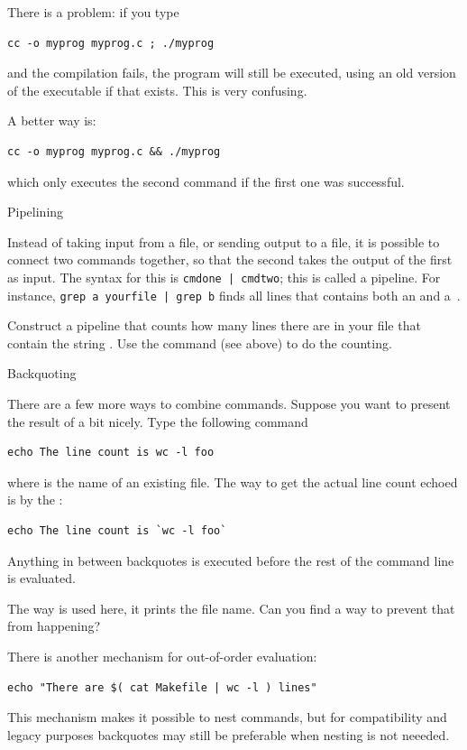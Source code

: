 There is a problem: if you type
\begin{lstlisting}
cc -o myprog myprog.c ; ./myprog
\end{lstlisting}
and the compilation fails, the program will still be executed,
using an old version of the executable if that exists. This is very
confusing.

A better way is:
\begin{lstlisting}
cc -o myprog myprog.c && ./myprog
\end{lstlisting}
which only executes the second command if the first one was
successful.

 {Pipelining}

Instead of taking input from a file, or sending output to a file, it
is possible to connect two commands together, so that the second takes
the output of the first as input. The syntax for this is
\verb+cmdone | cmdtwo+; this is called a pipeline. For instance,
\verb+grep a yourfile | grep b+ finds all lines that contains both an
 and a~.

\begin{exercise}
  Construct a pipeline that counts how many lines there are in your
  file that contain the string . Use the  command (see
  above) to do the counting.
\end{exercise}

 {Backquoting}
\label{tut:unix-backquote}

There are a few more ways to combine commands. Suppose you want to
present the result of  a bit nicely. Type the following command
\begin{lstlisting}
echo The line count is wc -l foo
\end{lstlisting}
where  is the name of an existing file. The way to
get the actual line count echoed is by the :
\begin{lstlisting}
echo The line count is `wc -l foo`
\end{lstlisting}
Anything in between backquotes is executed before the rest of the
command line is evaluated.

\begin{exercise}
  The way  is used here, it prints the
  file name. Can you find a way to prevent that from happening?
\end{exercise}

There is another mechanism for
out-of-order evaluation:
\begin{lstlisting}
echo "There are $( cat Makefile | wc -l ) lines"
\end{lstlisting}
This mechanism makes it possible to nest commands,
but for compatibility and legacy purposes backquotes
may still be preferable when nesting is not neeeded.


